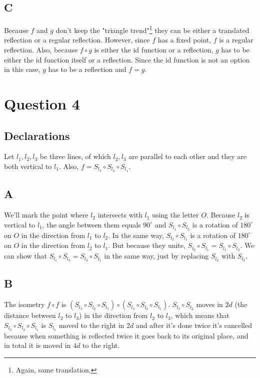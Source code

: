\documentclass[12pt, oneside]{article}
\begin{document}
\subsection{C}
Because $f$ and $g$ don't keep the "triangle trend"\footnote{Again, same translation.} they can be either a translated reflection or a regular reflection. However, since $f$ has a fixed point, $f$ is a regular reflection. Also, because $f \circ g$ is either the id function or a reflection, $g$ has to be either the id function itself or a reflection. Since the id function is not an option in this case, $g$ has to be a reflection and $f = g$.
\clearpage

\section{Question 4}
\setcounter{subsection}{-1}
\subsection{Declarations}
Let $l_1, l_2, l_3$ be three lines, of which $l_2, l_3$ are parallel to each other and they are both vertical to $l_1$. Also, $f = S_{l_3} \circ S_{l_2} \circ S_{l_1}$.

\subsection{A}
We'll mark the point where $l_2$ intersects with $l_1$ using the letter $O$. Because $l_2$ is vertical to $l_1$, the angle between them equals $90^{\circ}$ and $S_{l_1} \circ S_{l_2}$ is a rotation of $180^{\circ}$ on $O$ in the direction from $l_1$ to $l_2$. In the same way, $S_{l_2} \circ S_{l_1}$ is a rotation of $180^{\circ}$ on $O$ in the direction from $l_2$ to $l_1$. But because they unite, $S_{l_2} \circ S_{l_1} = S_{l_1} \circ S_{l_2}$. We can show that $S_{l_1} \circ S_{l_3} = S_{l_3} \circ S_{l_1}$ in the same way, just by replacing $S_{l_2}$ with $S_{l_3}$.

\subsection{B}
The isometry $f \circ f$ is $(S_{l_3} \circ S_{l_2} \circ S_{l_1}) \circ (S_{l_3} \circ S_{l_2} \circ S_{l_1})$. $S_{l_3} \circ S_{l_2}$ moves in $2d$ (the distance between $l_2$ to $l_3$) in the direction from $l_2$ to $l_3$, which means that $S_{l_3} \circ S_{l_2} \circ S_{l_1}$ is $S_{l_1}$ moved to the right in $2d$ and after it's done twice it's cancelled because when something is reflected twice it goes back to its original place, and in total it is moved in $4d$ to the right.
\end{document}
